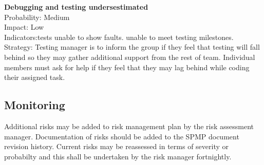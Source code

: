 \documentclass[11pt, a4paper]{article}
\begin{document}
			\textbf{Debugging and testing undersestimated}\\
			Probability: Medium\\
			Impact: Low\\
			Indicators:tests unable to show faults. unable to meet testing milestones.\\
			Strategy: Testing manager is to inform the group if they feel that testing will fall behind so they may gather additional support from the rest of team. Individual members must ask for help if they feel that they may lag behind while coding their assigned task.\\


		
		\subsection{Monitoring}
		Additional risks may be added to risk management plan by the risk assessment manager. Documentation of risks should be added to the SPMP document revision history.
		Current risks may be reassessed in terms of severity or probabilty and this shall be undertaken by the risk manager fortnightly.
\end{document}
